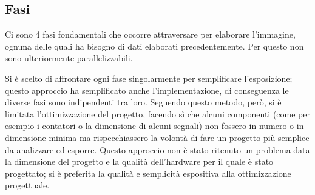 \documentclass[11pt]{article} %
\begin{document}
\subsection{Fasi}
Ci sono 4 fasi fondamentali che occorre attraversare per elaborare l'immagine, ognuna delle quali ha bisogno di dati elaborati precedentemente. Per questo non sono ulteriormente parallelizzabili.

Si è scelto di affrontare ogni fase singolarmente per semplificare l'esposizione; questo approccio ha semplificato anche l'implementazione, di conseguenza le diverse fasi sono indipendenti tra loro. Seguendo questo metodo, però, si è limitata l'ottimizzazione del progetto, facendo sì che alcuni componenti (come per esempio i contatori o la dimensione di alcuni segnali) non fossero in numero o in dimensione minima ma rispecchiassero la volontà di fare un progetto più semplice da analizzare ed esporre. Questo approccio non è stato ritenuto un problema data la dimensione del progetto e la qualità dell'hardware per il quale è stato progettato; si è preferita la qualità e semplicità espositiva alla ottimizzazione progettuale.
\end{document}
